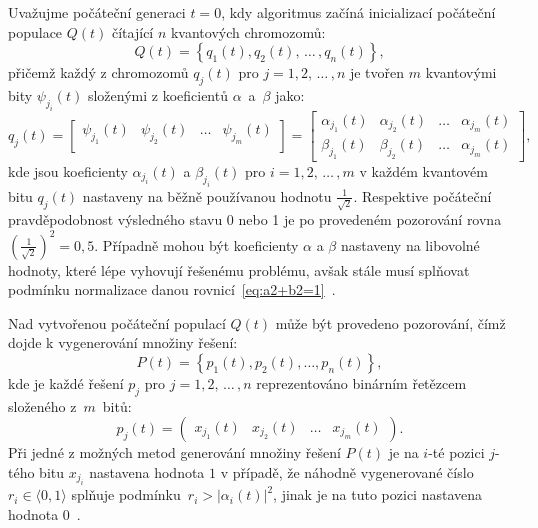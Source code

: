 Uvažujme počáteční generaci $t=0$, kdy algoritmus začíná inicializací počáteční populace $Q\left(t\right)$ čítající $n$ kvantových chromozomů:
\begin{equation}\label{eq:q(t)}
    Q\left(t\right) = \left\{ q_1\left(t\right), q_2\left(t\right),\,\dots\,, q_n\left(t\right) \right\},
\end{equation}
přičemž každý z chromozomů $q_j\left(t\right)$ pro $j = 1,2,\,\dots\,,n$ je tvořen $m$ kvantovými bity $\psi_{j_i}\left(t\right)$ složenými z koeficientů $\alpha$~a~$\beta$ jako:
\begin{equation*}
    q_j\left(t\right) =
    \begin{bmatrix}
        \psi_{j_1}\left(t\right) & \psi_{j_2}\left(t\right) & \dots & \psi_{j_m}\left(t\right) \\
    \end{bmatrix}
    =
    \begin{bmatrix}
        \alpha_{j_1}\left(t\right) & \alpha_{j_2}\left(t\right) & \dots & \alpha_{j_m}\left(t\right) \\
        \beta_{j_1}\left(t\right)  & \beta_{j_2}\left(t\right)  & \dots & \alpha_{j_m}\left(t\right)
    \end{bmatrix},
\end{equation*}
kde jsou koeficienty $\alpha_{j_i}\left(t\right)$ a $\beta_{j_i}\left(t\right)$ pro $i = 1,2,\,\dots\,,m$ v každém kvantovém bitu $q_j\left(t\right)$ nastaveny na běžně používanou hodnotu $\frac{1}{\sqrt{2}}$. 
Respektive počáteční pravděpodobnost výsledného stavu 0 nebo 1 je po provedeném pozorování rovna $\left(\frac{1}{\sqrt{2}}\right)^2 = 0{,}5$. 
Případně mohou být koeficienty $\alpha$ a $\beta$ nastaveny na libovolné hodnoty, které lépe vyhovují řešenému problému, avšak stále musí splňovat podmínku normalizace danou rovnicí~\ref{eq:a2+b2=1}~\cite{NaturalComputing,qiga}. 

Nad vytvořenou počáteční populací $Q\left(t\right)$ může být provedeno pozorování, čímž dojde k vygenerování množiny řešení:
\begin{equation}\label{eq:p(t)}
    P\left(t\right) = \left\{ p_1\left(t\right), p_2\left(t\right), \dots, p_n\left(t\right) \right\},
\end{equation}
kde je každé řešení $p_j$ pro $j = 1, 2,\,\dots\,, n$ reprezentováno binárním řetězcem složeného z~$m$~bitů:
\begin{equation*}
    p_j\left(t\right) = 
    \begin{pmatrix}
        x_{j_1}\left(t\right) & x_{j_2}\left(t\right) & \dots & x_{j_m}\left(t\right)
    \end{pmatrix}.
\end{equation*}
Při jedné z možných metod generování množiny řešení $P\left(t\right)$ je na $i$-té pozici $j$-tého bitu $x_{j_{i}}$ nastavena hodnota $1$ v případě, že náhodně vygenerované číslo $r_i \in \langle 0, 1\rangle$ splňuje podmínku~$r_i > \left| \alpha_i\left(t\right) \right|^2$, jinak je na tuto pozici nastavena hodnota $0$~\cite{NaturalComputing,qiga}.

